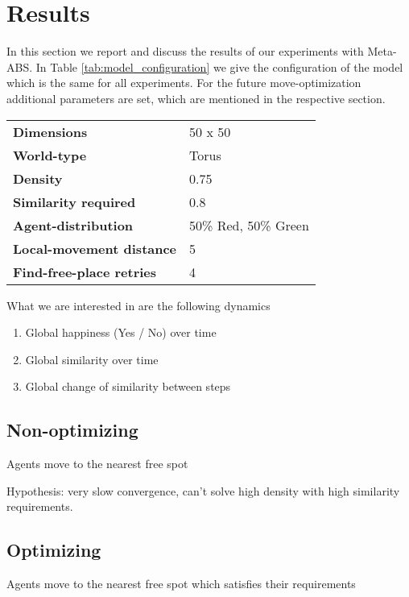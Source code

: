 \section{Results}
In this section we report and discuss the results of our experiments with Meta-ABS. In Table \ref{tab:model_configuration} we give the configuration of the model which is the same for all experiments. For the future move-optimization additional parameters are set, which are mentioned in the respective section.

\begin{table*}[t]
	\centering
	\caption{Model Configuration}
	\label{tab:model_configuration}
		\begin{tabular}{ l | l }
			\hline \hline
			\textbf{Dimensions}					& 50 x 50 \\  
			\textbf{World-type}					& Torus	\\ 
			\textbf{Density}					& 0.75	\\ 
			\textbf{Similarity required}		& 0.8	\\ 
			\textbf{Agent-distribution}			& 50\% Red, 50\% Green	\\ 
			\textbf{Local-movement distance}	& 5	\\ 
			\textbf{Find-free-place retries}	& 4	\\ 
			\hline \hline
		\end{tabular}
\end{table*}


What we are interested in are the following dynamics
\begin{enumerate}
	\item Global happiness (Yes / No) over time
	\item Global similarity over time
	\item Global change of similarity between steps
\end{enumerate}

\subsection{Non-optimizing}
Agents move to the nearest free spot

Hypothesis: very slow convergence, can't solve high density with high similarity requirements.

\subsection{Optimizing}
Agents move to the nearest free spot which satisfies their requirements

